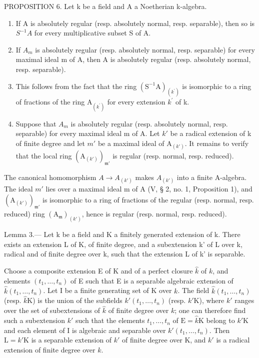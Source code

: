PROPOSITION 6. Let k be a field and A a Noetherian k-algebra.

\begin{enumerate}
\def\labelenumi{\alph{enumi})}
\item
  If A is absolutely regular (resp. absolutely normal, resp. separable), then so is \(S^{-1}A\) for every multiplicative subset S of A.
\item
  If \(A_{m}\) is absolutely regular (resp. absolutely normal, resp. separable) for every maximal ideal m of A, then A is absolutely regular (resp. absolutely normal, resp. separable).
\item
  This follows from the fact that the ring \((\mathrm{S}^{-1}\mathrm{A})_{(k^{\prime})}\) is isomorphic to a ring of fractions of the ring \(\mathrm{A}_{(k^{\prime})}\) for every extension \(k^{\prime}\) of k.
\item
  Suppose that \(A_{m}\) is absolutely regular (resp. absolutely normal, resp. separable) for every maximal ideal m of A. Let \(k'\) be a radical extension of k of finite degree and let \(m'\) be a maximal ideal of \(\mathrm{A}_{(k')}\). It remains to verify that the local ring \((\mathrm{A}_{(k')})_{\mathfrak{m}'}\) is regular (resp. normal, resp. reduced).
\end{enumerate}

The canonical homomorphism \(A \to A_{(k')}\) makes \(A_{(k')}\) into a finite A-algebra. The ideal \(m'\) lies over a maximal ideal m of A (V, § 2, no. 1, Proposition 1), and \((\mathrm{A}_{(k')})_{\mathfrak{m}'}\) is isomorphic to a ring of fractions of the regular (resp. normal, resp. reduced) ring \((\mathrm{A}_{\mathfrak{m}})_{(k')}\), hence is regular (resp. normal, resp. reduced).

Lemma 3.--- Let k be a field and K a finitely generated extension of k. There exists an extension L of K, of finite degree, and a subextension k' of L over k, radical and of finite degree over k, such that the extension L of k' is separable.

Choose a composite extension E of K and of a perfect closure \(\hat{k}\) of \(k\), and elements \((t_1, \ldots, t_n)\) of E such that E is a separable algebraic extension of \(\hat{k}(t_1, \ldots, t_n)\). Let I be a finite generating set of K over \(k\). The field \(\hat{k}(t_1, \ldots, t_n)\) (resp. \(\hat{k}\mathrm{K}\)) is the union of the subfields \(k'(t_1, \ldots, t_n)\) (resp. \(k'\mathrm{K}\)), where \(k'\) ranges over the set of subextensions of \(\hat{k}\) of finite degree over \(k\); one can therefore find such a subextension \(k'\) such that the elements \(t_1, \ldots, t_n\) of \(\mathrm{E} = \hat{k}\mathrm{K}\) belong to \(k'\mathrm{K}\) and each element of I is algebraic and separable over \(k'(t_1, \ldots, t_n)\). Then \(\mathrm{L} = k'\mathrm{K}\) is a separable extension of \(k'\) of finite degree over K, and \(k'\) is a radical extension of finite degree over \(k\).

